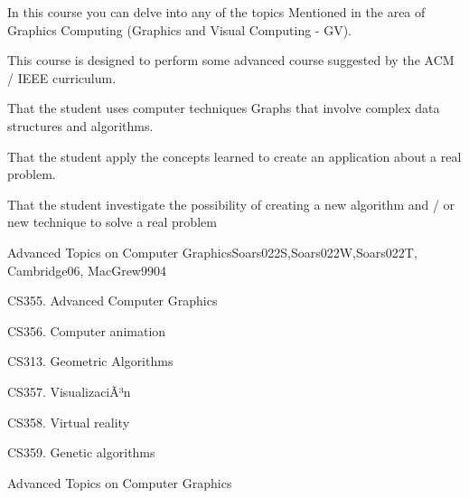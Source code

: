 \begin{syllabus}


\begin{justification}
In this course you can delve into any of the topics
Mentioned in the area of Graphics Computing (Graphics and Visual Computing - GV).

This course is designed to perform some advanced course suggested by the ACM / IEEE curriculum. \cite{Foley13,Hearn90}
\end{justification}

\begin{goals}
\item That the student uses computer techniques Graphs that involve complex data structures and algorithms.
\item That the student apply the concepts learned to create an application about a real problem.
\item That the student investigate the possibility of creating a new algorithm and / or new technique to solve a real problem
\end{goals}

\begin{outcomes}
    \item {}
    \item {}
    \item {}
    \item {}
\end{outcomes}

\begin{competences}
    \item {}
    \item {}
\end{competences}

\begin{unit}{Advanced Topics on Computer Graphics}{}{Soars022S,Soars022W,Soars022T, Cambridge06, MacGrew99}{0}{4}
   \begin{topics}
      \item CS355. Advanced Computer Graphics
      \item CS356. Computer animation
      \item CS313. Geometric Algorithms
      \item CS357. VisualizaciÃ³n
      \item CS358. Virtual reality
      \item CS359. Genetic algorithms
   \end{topics}

   \begin{learningoutcomes}
      \item Advanced Topics on Computer Graphics
   \end{learningoutcomes}
\end{unit}

\begin{coursebibliography}
\end{coursebibliography}

\end{syllabus}
